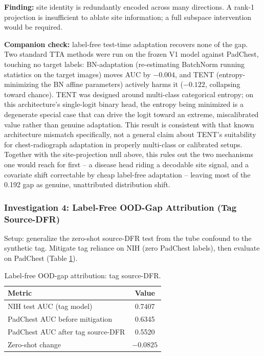 \documentclass{ieeeaccess}
\begin{document}
\textbf{Finding:} site identity is redundantly encoded across many
directions. A rank-1 projection is insufficient to ablate site information;
a full subspace intervention would be required.

\textbf{Companion check:} label-free test-time adaptation recovers none of
the gap. Two standard TTA methods were run on the frozen V1 model against
PadChest, touching no target labels: BN-adaptation (re-estimating BatchNorm
running statistics on the target images) moves AUC by $-0.004$, and TENT
(entropy-minimizing the BN affine parameters) actively harms it ($-0.122$,
collapsing toward chance). TENT was designed around multi-class categorical
entropy; on this architecture's single-logit binary head, the entropy being
minimized is a degenerate special case that can drive the logit toward an
extreme, miscalibrated value rather than genuine adaptation. This result is
consistent with that known architecture mismatch specifically, not a general
claim about TENT's suitability for chest-radiograph adaptation in properly
multi-class or calibrated setups. Together with the site-projection null
above, this rules out the two mechanisms one would reach for first -- a
disease head riding a decodable site signal, and a covariate shift
correctable by cheap label-free adaptation -- leaving most of the 0.192 gap
as genuine, unattributed distribution shift.

\subsubsection{Investigation 4: Label-Free OOD-Gap Attribution (Tag Source-DFR)}
Setup: generalize the zero-shot source-DFR test from the tube confound to
the synthetic tag. Mitigate tag reliance on NIH (zero PadChest labels), then
evaluate on PadChest (Table \ref{tab:tagsourcedfr}).

\begin{table}[h]
\caption{Label-free OOD-gap attribution: tag source-DFR.}
\label{tab:tagsourcedfr}
\centering
\small
\begin{tabular}{|l|c|}
\hline
Metric & Value \\
\hline
NIH test AUC (tag model) & 0.7407 \\
PadChest AUC before mitigation & 0.6345 \\
PadChest AUC after tag source-DFR & 0.5520 \\
Zero-shot change & $-0.0825$ \\
\hline
\end{tabular}
\end{table}
\end{document}

